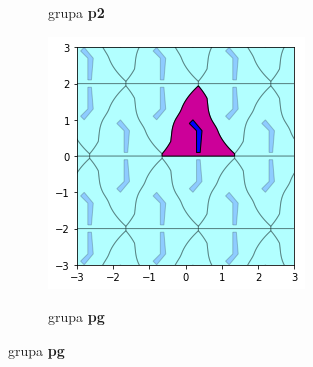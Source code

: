 \documentclass[12pt]{report}
\begin{document}
\begin{samepage}
\begin{figure}[H]
\begin{subfigure}[b]{0.3\textwidth}
    \label{fig:f21}
    \caption{grupa \textbf{p2}}
  \end{subfigure}
  \begin{subfigure}[b]{0.3\textwidth}
    \includegraphics[width=\textwidth]{output_21_10.png}
    \label{fig:f24}
    \caption{grupa \textbf{pg}}
  \end{subfigure}


\end{figure}
\end{samepage}
\end{document}
